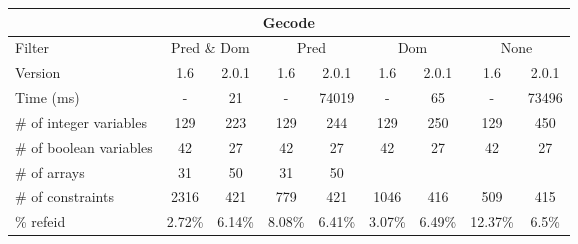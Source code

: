 \documentclass{standalone}
\begin{document}
\begin{tabular}{lc|c|c|c|c|c|c|c}
\multicolumn{9}{c}{Gecode} \\ 
\hline\hline Filter & \multicolumn{2}{c|}{Pred \& Dom} &\multicolumn{2}{c|}{Pred}  & \multicolumn{2}{c|}{Dom} & \multicolumn{2}{c}{None} \\ 
\hline Version & 1.6 & 2.0.1 & 1.6 & 2.0.1 & 1.6 & 2.0.1 & 1.6 & 2.0.1 \\ 
Time (ms)               & - & 21 & - & 74019 & - & 65 & - & 73496 \\ 
\# of integer variables & 129 & 223 & 129 & 244 & 129 & 250 & 129 & 450 \\ 
\# of boolean variables & 42 & 27 & 42 & 27 & 42 & 27 & 42 & 27 \\ 
\# of arrays            & 31 & 50 & 31 & 50 &  &  &  &  \\ 
\# of constraints       & 2316 & 421 & 779 & 421 & 1046 & 416 & 509 & 415 \\ 
\% refeid               & 2.72\% & 6.14\% & 8.08\% & 6.41\% & 3.07\% & 6.49\% & 12.37\% & 6.5\% \\ 
\end{tabular} 
\end{document}
